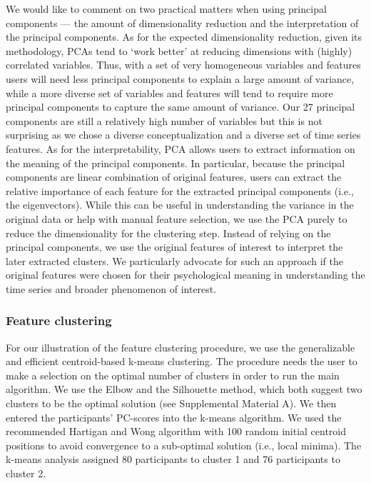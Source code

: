 We would like to comment on two practical matters when using principal
components --- the amount of dimensionality reduction and the
interpretation of the principal components. As for the expected
dimensionality reduction, given its methodology, PCAs tend to `work
better' at reducing dimensions with (highly) correlated variables. Thus,
with a set of very homogeneous variables and features users will need
less principal components to explain a large amount of variance, while a
more diverse set of variables and features will tend to require more
principal components to capture the same amount of variance. Our 27
principal components are still a relatively high number of variables but
this is not surprising as we chose a diverse conceptualization and a
diverse set of time series features. As for the interpretability, PCA
allows users to extract information on the meaning of the principal
components. In particular, because the principal components are linear
combination of original features, users can extract the relative
importance of each feature for the extracted principal components (i.e.,
the eigenvectors). While this can be useful in understanding the
variance in the original data or help with manual feature selection, we
use the PCA purely to reduce the dimensionality for the clustering step.
Instead of relying on the principal components, we use the original
features of interest to interpret the later extracted clusters. We
particularly advocate for such an approach if the original features were
chosen for their psychological meaning in understanding the time series
and broader phenomenon of interest.

\subsubsection{Feature clustering}

For our illustration of the feature clustering procedure, we use the
generalizable and efficient centroid-based k-means clustering. The
procedure needs the user to make a selection on the optimal number of
clusters in order to run the main algorithm. We use the Elbow and the
Silhouette method, which both suggest two clusters to be the optimal
solution (see Supplemental Material A). We then entered the
participants' PC-scores into the k-means algorithm. We used the
recommended Hartigan and Wong algorithm \citep{hartigan1979} with 100
random initial centroid positions to avoid convergence to a sub-optimal
solution (i.e., local minima). The k-means analysis assigned 80
participants to cluster 1 and 76 participants to cluster 2.

